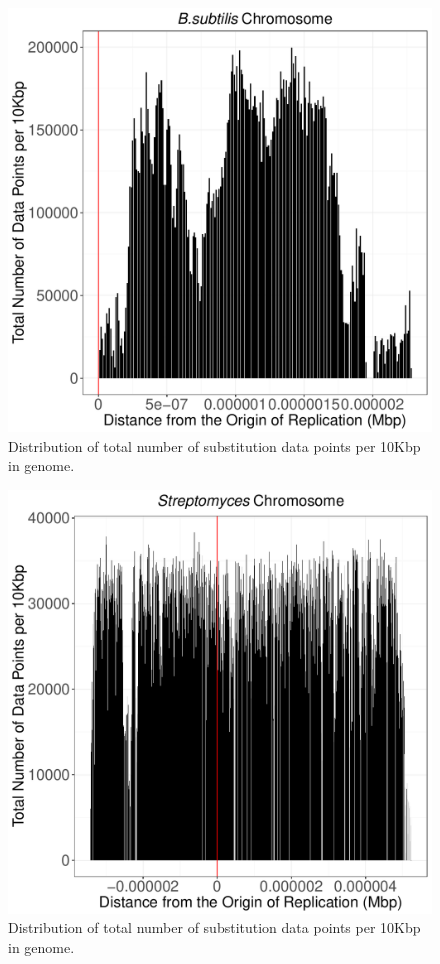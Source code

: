 \documentclass[12pt]{article}
\begin{document}
\begin{figure}
	\includegraphics[width=0.9\linewidth]{./bass_total_num_sites_graph.pdf}
	\caption{\label{fig:bass_tot_sites} Distribution of total number of substitution  data points per 10Kbp in genome.}
\end{figure}

\begin{figure}
	\includegraphics[width=0.9\linewidth]{./strep_total_num_sites_graph.pdf}
	\caption{\label{fig:strep_tot_sites} Distribution of total number of substitution  data points per 10Kbp in genome.}
\end{figure}
\end{document}
